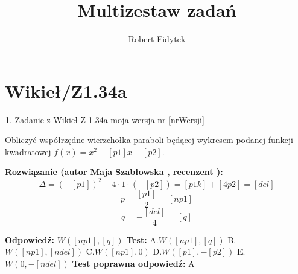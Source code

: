 \documentclass[12pt, a4paper]{article}
\title{Multizestaw zadań}
\author{Robert Fidytek}
\date{}
\theoremstyle{definition} %
\newtheorem{zad}{}
\newcommand{\kategoria}[1]{\section{#1}} %
\newcommand{\zadStart}[1]{\begin{zad}#1\newline} %
\newcommand{\zadStop}{\end{zad}}   %
\newcommand{\rozwStart}[2]{\noindent \textbf{Rozwiązanie (autor #1 , recenzent #2): }\newline} %
\newcommand{\rozwStop}{\newline}                                            %
\newcommand{\odpStart}{\noindent \textbf{Odpowiedź:}\newline}    %
\newcommand{\odpStop}{\newline}                                             %
\newcommand{\testStart}{\noindent \textbf{Test:}\newline} %
\newcommand{\testStop}{\newline} %
\newcommand{\kluczStart}{\noindent \textbf{Test poprawna odpowiedź:}\newline} %
\newcommand{\kluczStop}{\newline} %
\begin{document}
\maketitle


\kategoria{Wikieł/Z1.34a}
\zadStart{Zadanie z Wikieł Z 1.34a moja wersja nr [nrWersji]}


Obliczyć współrzędne wierzchołka paraboli będącej wykresem podanej funkcji kwadratowej $f(x)=x^{2}-[p1]x-[p2].$
\zadStop

\rozwStart{Maja Szabłowska}{}
$$\Delta=(-[p1])^{2}-4\cdot1\cdot(-[p2])=[p1k]+[4p2]=[del]$$
$$p=\frac{[p1]}{2}=[np1]$$
$$q=-\frac{[del]}{4}=[q]$$
\rozwStop


\odpStart
$W([np1],[q])$
\odpStop
\testStart
A.$W([np1],[q])$
B.$W([np1],[ndel])$
C.$W([np1],0)$
D.$W([p1],-[p2])$
E.$W(0,-[ndel])$
\testStop
\kluczStart
A
\kluczStop
\end{document}
